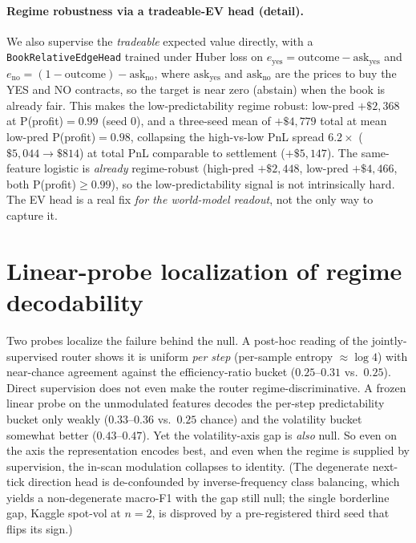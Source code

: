 \documentclass{article}
\begin{document}
\paragraph{Regime robustness via a tradeable-EV head (detail).}
We also supervise the \emph{tradeable} expected value directly, with a
\texttt{BookRelativeEdgeHead} trained under Huber loss on
$e_{\text{yes}}=\text{outcome}-\text{ask}_{\text{yes}}$ and
$e_{\text{no}}=(1-\text{outcome})-\text{ask}_{\text{no}}$, where
$\text{ask}_{\text{yes}}$ and $\text{ask}_{\text{no}}$ are the prices to buy the YES
and NO contracts, so the target is near zero (abstain) when the book is already
fair. This makes the low-predictability
regime robust: low-pred $+\$2{,}368$ at P(profit)$=0.99$ (seed 0), and a three-seed
mean of $+\$4{,}779$ total at mean low-pred P(profit)$=0.98$, collapsing the
high-vs-low PnL spread $6.2\times$ ($\$5{,}044\to\$814$) at total PnL comparable to
settlement ($+\$5{,}147$). The same-feature logistic is \emph{already} regime-robust
(high-pred $+\$2{,}448$, low-pred $+\$4{,}466$, both P(profit)$\ge0.99$), so the
low-predictability signal is not intrinsically hard. The EV head is a real fix
\emph{for the world-model readout}, not the only way to capture it.

\section{Linear-probe localization of regime decodability}\label{app:probe}

Two probes localize the failure behind the null. A post-hoc reading of the
jointly-supervised router shows it is uniform \emph{per step} (per-sample entropy
$\approx\log 4$) with near-chance agreement against the efficiency-ratio bucket
($0.25$--$0.31$ vs.\ $0.25$). Direct supervision does not even make the router
regime-discriminative. A frozen linear probe on the unmodulated features decodes
the per-step predictability bucket only weakly ($0.33$--$0.36$ vs.\ $0.25$ chance)
and the volatility bucket somewhat better ($0.43$--$0.47$). Yet the volatility-axis
gap is \emph{also} null. So even on the axis the representation encodes best, and
even when the regime is supplied by supervision, the in-scan modulation collapses to
identity. (The degenerate next-tick direction head is de-confounded by
inverse-frequency class balancing, which yields a non-degenerate macro-F1 with the
gap still null; the single borderline gap, Kaggle spot-vol at $n{=}2$, is disproved
by a pre-registered third seed that flips its sign.)
\end{document}
